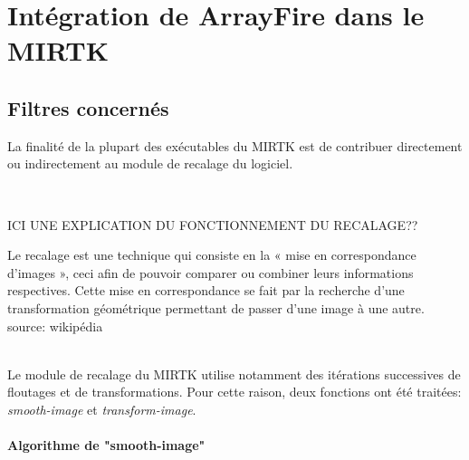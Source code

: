 \documentclass[10pt]{report}
\begin{document}
	
	
	
	\section{Intégration de ArrayFire dans le MIRTK}
	\subsection{Filtres concernés}
	La finalité de la plupart des exécutables du MIRTK est de contribuer directement ou indirectement au module de recalage du logiciel. 
	
	~\par
	ICI UNE EXPLICATION DU FONCTIONNEMENT DU RECALAGE??
	
	
	 Le recalage est une technique qui consiste en la « mise en correspondance d'images », ceci afin de pouvoir comparer ou combiner leurs informations respectives. Cette mise en correspondance se fait par la recherche d'une transformation géométrique permettant de passer d'une image à une autre.
	 source: wikipédia
	\\~\par
	Le module de recalage du MIRTK utilise notamment des itérations successives de floutages et de transformations. Pour cette raison, deux fonctions ont été traitées: \textit{smooth-image} et \textit{transform-image}.
	\paragraph{Algorithme de "smooth-image"}
~\par
\end{document}
